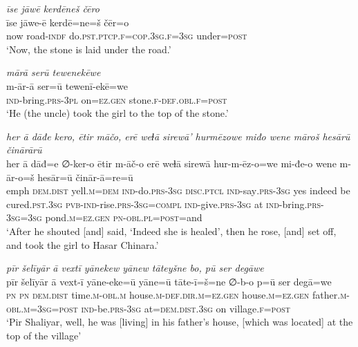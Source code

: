 \ea \label{ZP.53}
\textit{īse jāwē kerdēneš čēro} \\ 
\gll īse jāwe-ē kerdē=ne=š čēr=o \\ 
 now road\textsc{-indf} do\textsc{.pst}\textsc{.ptcp}\textsc{.f}\textsc{=cop}\textsc{.3sg}\textsc{.f}\textsc{=3sg} under\textsc{=\textsc{post}} \\ 
\glt `Now, the stone is laid under the road.'
\z 
 
\ea \label{ZP.55}
\textit{mārā serū tewenekēwe} \\ 
\gll m-ār-ā ser=ū tewenī-ekē=we \\ 
 \textsc{ind-}bring\textsc{.prs}\textsc{-3pl} on\textsc{\textsc{=ez.gen}} stone\textsc{.f}\textsc{-def}\textsc{.obl}\textsc{.f}\textsc{=\textsc{post}} \\ 
\glt `He (the uncle) took the girl to the top of the stone.'
\z 
 
\ea \label{ZP.61}
\textit{her ā dāđe kero, ētir māčo, erē weɫā sirewā’ hurmēzowe miđo wene māroš hesārū činārārū} \\ 
\gll her ā dāđ=e ∅-ker-o ētir m-āč-o erē weɫā sirewā hur-m-ēz-o=we mi-đe-o wene m-ār-o=š hesār=ū činār-ā=re=ū \\ 
 emph \textsc{dem.dist} yell\textsc{.m}\textsc{=dem} \textsc{ind-}do\textsc{.prs}\textsc{-3sg} \textsc{disc.ptcl} \textsc{ind-}say\textsc{.prs}\textsc{-3sg} yes indeed be cured\textsc{.pst}\textsc{.3sg} \textsc{pvb-}\textsc{ind-}rise\textsc{.prs}\textsc{-3sg}\textsc{=compl} \textsc{ind-}give\textsc{.prs}\textsc{-3sg} at \textsc{ind-}bring\textsc{.prs}\textsc{-3sg}\textsc{=3sg} pond\textsc{.m}\textsc{\textsc{=ez.gen}} \textsc{pn}\textsc{-obl}\textsc{.pl}\textsc{=\textsc{post}}=and \\ 
\glt `After he shouted [and] said, ‘Indeed she is healed’, then he rose, [and] set off, and took the girl to Hasar Chinara.'
\z 
 
\ea \label{ZP.65}
\textit{pīr šelīyār ā vextī yānekew yānew tāteyšne bo, pū ser degāwe} \\ 
\gll pīr šelīyār ā vext-ī yāne-eke=ū yāne=ū tāte-ī=š=ne ∅-b-o p=ū ser degā=we \\ 
 \textsc{pn} \textsc{pn} \textsc{dem.dist} time\textsc{.m}\textsc{-obl}\textsc{.m} house\textsc{.m}\textsc{-def}\textsc{.dir}\textsc{.m}\textsc{\textsc{=ez.gen}} house\textsc{.m}\textsc{\textsc{=ez.gen}} father\textsc{.m}\textsc{-obl}\textsc{.m}\textsc{=3sg}\textsc{=\textsc{post}} \textsc{ind-}be\textsc{.prs}\textsc{-3sg} at=\textsc{dem.dist}\textsc{.3sg} on village\textsc{.f}\textsc{=\textsc{post}} \\ 
\glt `Pir Shaliyar, well, he was [living] in his father’s house, [which was located] at the top of the village'
\z 
 

